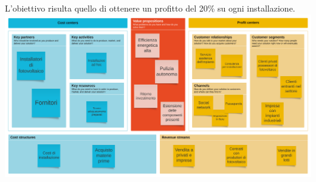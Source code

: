 \documentclass[a4paper, 12pt]{article}
\begin{document}
	L'obiettivo risulta quello di ottenere un profitto del 20\% su ogni installazione.\\
	\includegraphics[width=\textwidth]{Images/BusinessModelCanvas.png}
\end{document}
